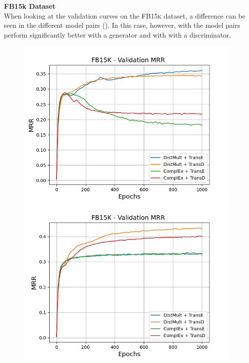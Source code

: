 \textbf{FB15k Dataset}
\label{subsubsec:methods_fb15k}\\
%
When looking at the validation curves on the \textsc{FB15k} dataset, a difference can be seen in the different model pairs ().
In this case, however, with \usmax the model pairs perform significantly better with a \distmult generator and with \ussoftmax with a \transd discriminator.
\begin{figure}[H]
    \centering
    \begin{minipage}{.5\textwidth}
      \centering
      \includegraphics[width=0.9\linewidth]{figures/results/gan_train/not_pretrained/uncertainty/max/entropy/fb15k/1k_epochs/uncertainty_fb15k_mrrs.png}
    \end{minipage}%
    \begin{minipage}{.5\textwidth}
      \centering
      \includegraphics[width=0.9\linewidth]{figures/results/gan_train/not_pretrained/uncertainty/max_distribution/entropy/fb15k/1k_epochs/uncertainty_fb15k_mrrs.png}

\end{minipage}
\end{figure}

